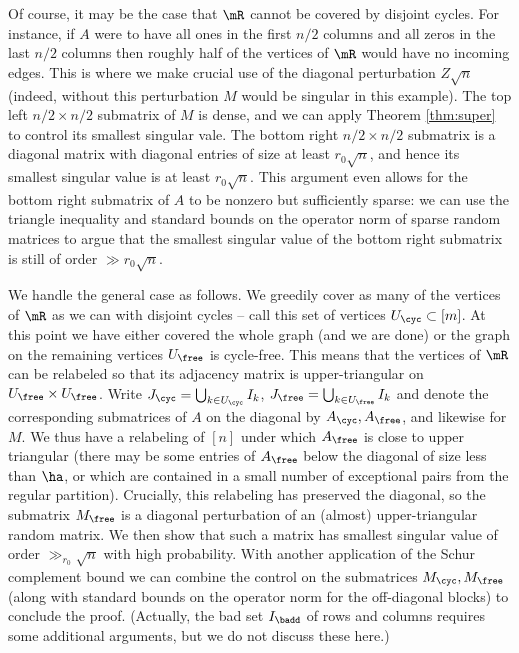 \documentclass[aop,preprint]{imsart}
\theoremstyle{plain}
\theoremstyle{definition}
\theoremstyle{remark}
\numberwithin{equation}{section}
\numberwithin{theorem}{section}
\begin{document}
Of course, it may be the case that $\mR$ cannot be covered by disjoint cycles. 
For instance, if $A$ were to have all ones in the first $n/2$ columns and all zeros in the last $n/2$ columns then roughly half of the vertices of $\mR$ would have no incoming edges. 
This is where we make crucial use of the diagonal perturbation $Z\sqrt{n}$ (indeed, without this perturbation $M$ would be singular in this example).
The top left $n/2\times n/2$ submatrix of $M$ is dense, and we can apply Theorem \ref{thm:super} to control its smallest singular vale. 
The bottom right $n/2\times n/2$ submatrix is a diagonal matrix with diagonal entries of size at least $r_0\sqrt{n}$, and hence its smallest singular value is at least $r_0\sqrt{n}$. 
This argument even allows for the bottom right submatrix of $A$ to be nonzero but sufficiently sparse: we can use the triangle inequality and standard bounds on the operator norm of sparse random matrices to argue that the smallest singular value of the bottom right submatrix is still of order $\gg r_0\sqrt{n}$.

We handle the general case as follows. 
We greedily cover as many of the vertices of $\mR$ as we can with disjoint cycles -- call this set of vertices $U_{\cyc}\subset[m]$. 
At this point we have either covered the whole graph (and we are done) or the graph on the remaining vertices $U_{\free}$ is cycle-free. This means that the vertices of $\mR$ can be relabeled so that its adjacency matrix is upper-triangular on $U_{\free}\times U_{\free}$. 
Write $J_{\cyc} = \bigcup_{k\in U_{\cyc}} I_k$, $J_{\free}=\bigcup_{k\in U_{\free}}I_k$ and denote the corresponding submatrices of $A$ on the diagonal by $A_{\cyc}, A_{\free}$, and likewise for $M$. 
We thus have a relabeling of $[n]$ under which $A_{\free}$ is close to upper triangular (there may be some entries of $A_{\free}$ below the diagonal of size less than $\ha$, or which are contained in a small number of exceptional pairs from the regular partition).
Crucially, this relabeling has preserved the diagonal, so the submatrix $M_{\free}$ is a diagonal perturbation of an (almost) upper-triangular random matrix. 
We then show that such a matrix has smallest singular value of order $\gg_{r_0}\sqrt{n}$ with high probability. 
With another application of the Schur complement bound we can combine the control on the submatrices $M_{\cyc},M_{\free}$ (along with standard bounds on the operator norm for the off-diagonal blocks) to conclude the proof.
(Actually, the bad set $I_{\badd}$ of rows and columns requires some additional arguments, but we do not discuss these here.)
\end{document}
